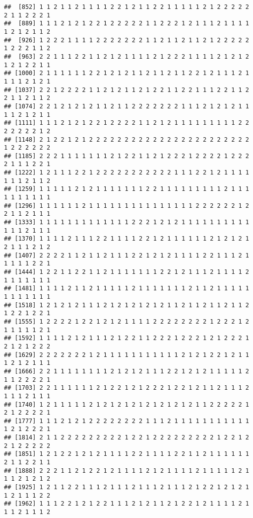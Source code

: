 \documentclass[
]{article}
\begin{document}
\begin{verbatim}
##  [852] 1 1 2 1 1 2 1 1 1 1 2 2 1 2 1 1 2 2 1 1 1 1 1 2 1 2 2 2 2 2 2 1 1 2 2 2 1
##  [889] 1 1 1 2 1 2 1 2 2 1 2 2 2 2 2 1 1 2 2 2 1 2 1 1 1 2 1 1 1 1 1 2 1 2 1 1 2
##  [926] 1 2 2 2 1 1 1 1 2 2 2 2 2 2 2 1 1 2 1 1 2 1 1 2 1 2 2 2 2 2 1 2 2 2 1 1 2
##  [963] 2 2 1 1 1 2 2 1 1 2 1 2 1 1 1 1 2 1 2 2 2 1 1 1 1 2 1 2 1 2 1 2 1 2 2 1 1
## [1000] 2 1 1 1 1 1 1 2 2 1 2 1 2 1 1 2 1 1 2 1 1 2 2 1 2 1 1 1 2 1 1 1 1 2 1 2 1
## [1037] 2 2 1 2 2 2 2 1 1 2 1 2 1 1 2 1 2 2 1 1 2 2 1 1 1 2 2 1 1 2 2 1 1 2 1 1 2
## [1074] 2 2 1 2 1 2 1 2 1 1 2 1 1 2 2 2 2 2 2 2 1 1 1 2 1 2 1 2 1 1 1 1 2 1 2 1 1
## [1111] 1 1 1 2 1 2 1 2 2 1 2 2 2 2 1 1 2 1 2 1 1 1 1 1 1 1 1 1 2 2 2 2 2 2 2 1 2
## [1148] 2 1 2 2 1 2 1 2 2 2 2 2 2 2 2 2 2 2 2 2 2 2 2 2 2 2 2 2 2 2 1 2 2 2 2 2 2
## [1185] 2 2 2 1 1 1 1 1 1 1 2 1 2 2 1 1 2 1 2 2 2 1 2 2 2 2 1 2 2 2 2 1 1 1 2 2 1
## [1222] 1 2 1 1 1 2 2 1 2 2 2 2 2 2 2 2 2 2 2 1 1 1 2 2 1 2 1 1 1 1 1 1 1 2 1 1 2
## [1259] 1 1 1 1 1 2 1 2 1 1 1 1 1 1 1 2 2 1 1 1 1 1 1 1 1 1 2 1 1 1 1 1 1 1 1 1 1
## [1296] 1 1 1 1 1 1 2 1 1 1 1 1 1 1 1 1 1 1 1 1 1 1 2 2 2 2 2 2 1 2 2 1 1 2 1 1 1
## [1333] 1 1 1 1 1 1 1 1 1 1 1 1 1 2 2 2 1 2 1 2 1 1 1 1 1 1 1 1 1 1 1 1 1 2 1 1 1
## [1370] 1 1 1 1 2 1 1 1 2 2 1 1 1 1 2 2 1 2 1 1 1 1 1 1 2 1 2 1 2 1 2 1 1 1 2 1 2
## [1407] 2 2 2 2 1 1 2 1 1 2 1 1 1 2 2 1 2 1 2 1 1 1 1 2 2 1 1 1 2 1 1 1 1 1 2 2 1
## [1444] 1 2 2 1 1 2 2 1 1 2 1 1 1 1 1 1 1 2 2 1 2 1 1 1 2 1 1 1 1 2 1 1 1 1 1 1 1
## [1481] 1 1 1 1 2 1 1 2 1 1 1 1 1 2 1 1 1 1 1 1 1 2 1 1 2 1 1 1 1 1 1 1 1 1 1 1 1
## [1518] 1 2 1 2 1 2 1 1 1 2 1 2 1 2 1 2 1 2 1 1 2 1 1 2 1 1 2 1 1 2 1 2 2 1 2 2 1
## [1555] 1 2 2 2 2 1 2 2 1 2 1 2 1 1 1 1 2 2 2 2 2 2 2 2 1 2 2 2 1 2 1 1 1 1 1 2 1
## [1592] 1 1 1 1 2 1 2 1 1 1 2 1 2 2 1 1 2 2 2 1 2 2 2 1 2 1 2 2 2 1 2 1 2 1 2 2 2
## [1629] 2 2 2 2 2 2 2 1 2 1 1 1 1 1 1 1 1 1 1 1 2 1 2 1 2 2 1 2 1 1 1 2 1 2 1 1 1
## [1666] 2 2 1 1 1 1 1 1 1 1 2 1 2 1 2 1 1 1 2 2 1 2 1 2 1 1 1 1 1 2 1 1 2 2 2 2 1
## [1703] 2 2 1 1 1 1 1 1 2 1 2 2 1 2 1 2 2 2 1 2 2 1 2 1 1 2 1 1 1 2 1 1 1 2 1 1 1
## [1740] 1 2 1 1 1 1 1 2 1 2 1 2 1 2 1 2 1 2 1 2 1 2 1 1 2 2 2 2 2 1 2 1 2 2 2 2 1
## [1777] 1 1 1 2 1 2 1 2 2 2 2 2 2 2 2 1 1 1 2 1 1 1 1 1 1 1 1 1 1 1 1 2 1 2 2 2 1
## [1814] 2 1 1 2 2 2 2 2 2 2 2 2 1 2 2 1 2 2 2 2 2 2 2 2 2 1 2 2 1 2 2 1 2 2 2 2 2
## [1851] 1 2 1 2 2 1 2 1 2 1 1 1 1 2 2 1 1 1 1 2 2 1 1 2 1 1 1 1 1 1 2 1 1 2 2 1 1
## [1888] 2 2 2 1 1 2 1 2 2 1 2 1 1 1 1 2 1 2 1 1 1 1 2 1 1 1 1 1 2 1 1 1 2 1 2 1 2
## [1925] 1 2 1 1 2 2 1 1 1 2 1 1 1 2 1 1 1 2 1 1 1 2 1 2 2 1 2 1 2 1 1 2 1 1 1 2 2
## [1962] 1 1 1 2 2 1 2 1 2 2 1 1 1 2 1 2 1 1 2 1 2 2 1 2 1 1 1 1 2 1 1 1 2 1 1 1 2

\end{verbatim}
\end{document}

